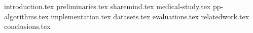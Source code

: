 \documentclass[inscr,ack,dvipsnames]{dithesis}
\begin{document}

\frontmatter

\mainmatter


{introduction.tex}
{preliminaries.tex}
{sharemind.tex}
{medical-study.tex}
{pp-algorithms.tex}
{implementation.tex}
{datasets.tex}
{evaluations.tex}
{relatedwork.tex}
{conclusions.tex}


\backmatter
\end{document}
